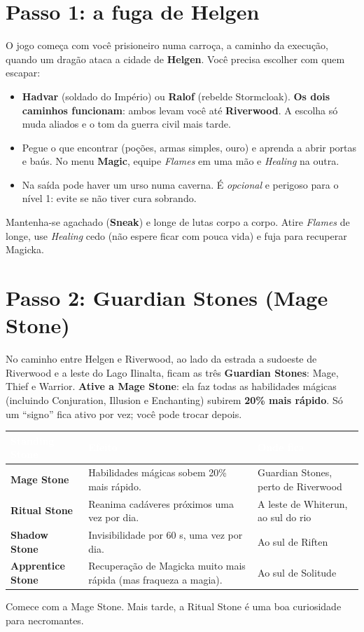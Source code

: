 \documentclass[11pt,a4paper,oneside,openany]{book}
\newcommand{\magia}[1]{\textit{\textcolor{SoulCairnPurple}{#1}}}
\newcommand{\lugar}[1]{\textbf{\textcolor{ImperialGold!75!black}{#1}}}
\newcommand{\npc}[1]{\textbf{#1}}
\newcommand{\cabec}[1]{\textcolor{white}{\sffamily\bfseries\small #1}}
\newcommand{\tabhead}{\rowcolor{NecroEmerald}}
\begin{document}
\section{Passo 1: a fuga de Helgen}
O jogo começa com você prisioneiro numa carroça, a caminho da execução, quando um dragão ataca a cidade de \lugar{Helgen}. Você precisa escolher com quem escapar:

\begin{itemize}
  \item \npc{Hadvar} (soldado do Império) ou \npc{Ralof} (rebelde Stormcloak). \textbf{Os dois caminhos funcionam}: ambos levam você até \lugar{Riverwood}. A escolha só muda aliados e o tom da guerra civil mais tarde.
  \item Pegue o que encontrar (poções, armas simples, ouro) e aprenda a abrir portas e baús. No menu \textbf{Magic}, equipe \magia{Flames} em uma mão e \magia{Healing} na outra.
  \item Na saída pode haver um urso numa caverna. É \emph{opcional} e perigoso para o nível 1: evite se não tiver cura sobrando.
\end{itemize}

\begin{dica}
Mantenha-se agachado (\textbf{Sneak}) e longe de lutas corpo a corpo. Atire \magia{Flames} de longe, use \magia{Healing} cedo (não espere ficar com pouca vida) e fuja para recuperar Magicka.
\end{dica}

\section{Passo 2: Guardian Stones (Mage Stone)}
No caminho entre Helgen e Riverwood, ao lado da estrada a sudoeste de Riverwood e a leste do Lago Ilinalta, ficam as três \lugar{Guardian Stones}: Mage, Thief e Warrior. \textbf{Ative a Mage Stone}: ela faz todas as habilidades mágicas (incluindo Conjuration, Illusion e Enchanting) subirem \textbf{20\% mais rápido}. Só um ``signo'' fica ativo por vez; você pode trocar depois.

\begin{center}
\begin{tabularx}{\linewidth}{@{}L{2.6cm}Y L{4.2cm}@{}}
\tabhead \cabec{Standing Stone} & \cabec{Efeito} & \cabec{Onde fica} \\
\toprule
\textbf{Mage Stone} & Habilidades mágicas sobem 20\% mais rápido. & Guardian Stones, perto de Riverwood \\
\textbf{Ritual Stone} & Reanima cadáveres próximos uma vez por dia. & A leste de Whiterun, ao sul do rio \\
\textbf{Shadow Stone} & Invisibilidade por 60 s, uma vez por dia. & Ao sul de Riften \\
\textbf{Apprentice Stone} & Recuperação de Magicka muito mais rápida (mas fraqueza a magia). & Ao sul de Solitude \\
\bottomrule
\end{tabularx}
\end{center}
Comece com a Mage Stone. Mais tarde, a Ritual Stone é uma boa curiosidade para necromantes.
\end{document}
